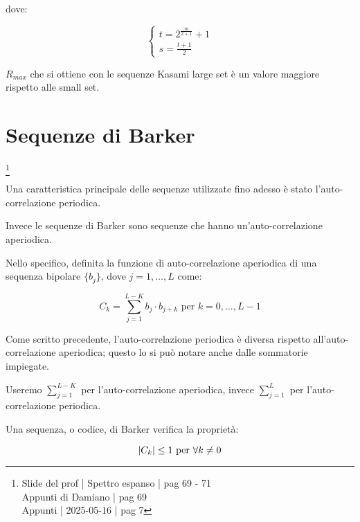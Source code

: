 dove: 

{
    \Large 
    \begin{equation}
        \begin{cases}
        t = 2^{\frac{m}{2 + 1}} + 1 
        \\
        s = \frac{t + 1}{2}
        \end{cases}
    \end{equation}
}

$R_{max}$ che si ottiene con le sequenze Kasami large set è un valore maggiore rispetto alle small set. \newline 

\newpage 

\section{Sequenze di Barker}
\footnote{Slide del prof | Spettro espanso | pag 69 - 71\\
Appunti di Damiano | pag 69\\
Appunti | 2025-05-16 | pag 7 
} 

Una caratteristica principale delle sequenze utilizzate fino adesso 
è stato l'auto-correlazione periodica. \newline 

Invece le sequenze di Barker sono sequenze che hanno un'auto-correlazione aperiodica. \newline

Nello specifico, 
definita la funzione di auto-correlazione aperiodica di una sequenza bipolare $\{ b_j\}$, 
dove $j = 1, \dots, L$ come: 

{
    \Large 
    \begin{equation}
        C_k = \sum_{j = 1}^{L-K} b_j \cdot b_{j+k} \text{ per } k = 0, \dots, L-1
     \end{equation}
}

\begin{tcolorbox}
Come scritto precedente, 
l'auto-correlazione periodica è diversa rispetto all'auto-correlazione aperiodica; 
questo lo si può notare anche dalle sommatorie impiegate. \newline 

Useremo $\sum_{j = 1}^{L-K}$ per l'auto-correlazione aperiodica, 
invece $\sum_{j = 1}^{L}$ per l'auto-correlazione periodica. 
\end{tcolorbox}

Una sequenza, o codice, di Barker verifica la proprietà: 

{
    \Large 
    \begin{equation}
        \abs{C_k} \le 1 \text{ per } \forall k \neq 0
    \end{equation}
}

